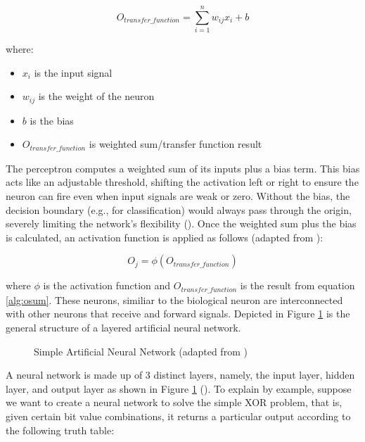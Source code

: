 \begin{equation}\label{alg:osum}
    O_{transfer\_function} = \sum_{i = 1}^{n}w_{ij}x_{i}+b
\end{equation}

\noindent where:
\begin{itemize}
    \item $x_{i}$ is the input signal
    \item $w_{ij}$ is the weight of the neuron
    \item $b$ is the bias
    \item $O_{transfer\_function}$ is weighted sum/transfer function result
\end{itemize}

\noindent The perceptron computes a weighted sum of its inputs plus a bias term. This bias acts like an adjustable threshold, shifting the activation left or right to ensure the neuron can fire even when input signals are weak or zero. Without the bias, the decision boundary (e.g., for classification) would always pass through the origin, severely limiting the network's flexibility (\cite{importance_of_bias}). Once the weighted sum plus the bias is calculated, an activation function is applied as follows (adapted from \cite{suzuki2011artificial}):

\begin{equation}
    O_j = \phi(O_{transfer\_function})
\end{equation}

\noindent where $\phi$ is the activation function and $O_{transfer\_function}$ is the result from equation \ref{alg:osum}. These neurons, similiar to the biological neuron are interconnected with other neurons that receive and forward signals. Depicted in Figure \ref{fig:ne_simple_neural_network} is the general structure of a layered artificial neural network.

\begin{figure}[H] %
    \centering %
    \caption{Simple Artificial Neural Network (adapted from \cite{nielsen2015neural})}
    \label{fig:ne_simple_neural_network} %
\end{figure}

\noindent A neural network is made up of 3 distinct layers, namely, the input layer, hidden layer, and output layer as shown in Figure \ref{fig:ne_simple_neural_network} (\cite{nielsen2015neural}). To explain by example, suppose we want to create a neural network to solve the simple XOR problem, that is, given certain bit value combinations, it returns a particular output according to the following truth table:

